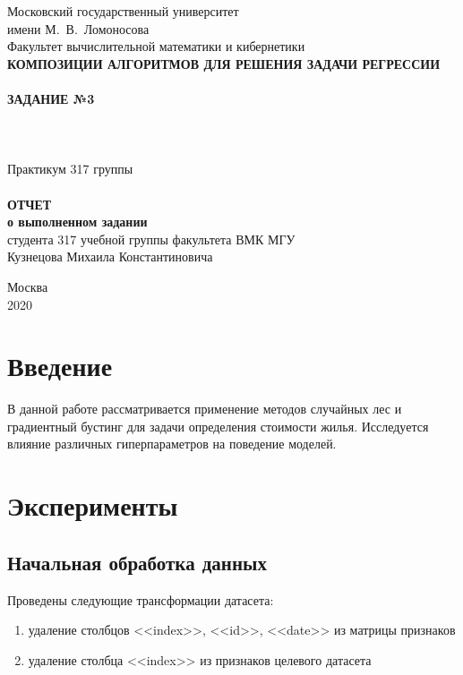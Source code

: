 \documentclass[12pt,fleqn]{article}
\begin{document}
\begin{titlepage}
    \begin{center}
	{\small \sc Московский государственный университет \\имени М.~В.~Ломоносова\\
	Факультет вычислительной математики и кибернетики\\}
	\vfill
	{\large \bf\MakeUppercase{Композиции алгоритмов для решения задачи регрессии} }\\ 
	~\\
	{\large \bf ЗАДАНИЕ №3}
	~\\
	~\\
	~\\
	~\\
	{\large \sc Практикум 317 группы}\\ 
	~\\
	{\large \bf ОТЧЕТ}\\ 
	{\large \bf о выполненном задании}\\
	{\large \br студента 317 учебной группы факультета ВМК МГУ}\\
	{\large \br Кузнецова Михаила Константиновича}\\
    \end{center}
    \begin{center}
	\vfill
	{\small Москва\\2020}
    \end{center}
\end{titlepage}

\section{Введение}
В данной работе рассматривается применение методов случайных лес и градиентный бустинг для задачи определения стоимости жилья. Исследуется влияние различных гиперпараметров на поведение моделей.

\section{Эксперименты}
\subsection{Начальная обработка данных}
Проведены следующие трансформации датасета:

\begin{enumerate}[noitemsep]
    \item удаление столбцов <<index>>, <<id>>, <<date>> из матрицы признаков
    \item удаление столбца <<index>> из признаков целевого датасета
\end{enumerate}
\end{document}
